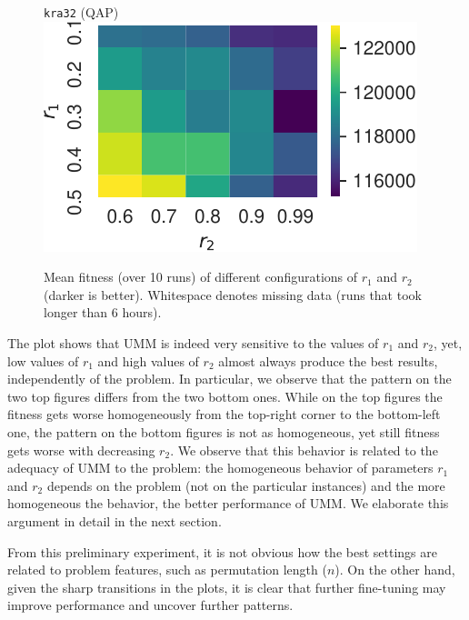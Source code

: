 \documentclass[runningheads]{llncs}
\begin{document}
\begin{figure}[htb]
\begin{minipage}{0.49\linewidth}
\end{minipage}
\begin{minipage}{0.49\linewidth}
  \centering
  \texttt{kra32} (QAP)\\[-0.5ex]
\includegraphics[width=\textwidth]{../img/heatmap_kra32_dat}
\end{minipage}
\caption{Mean fitness (over 10 runs) of different configurations of $r_1$ and $r_2$ (darker is better). Whitespace denotes missing data (runs that took longer than 6 hours).\label{fig:heatmaps}}
\end{figure}

The plot shows that UMM is indeed very sensitive to the values of $r_1$ and
$r_2$, yet, low values of $r_1$ and high values of $r_2$ almost always produce
the best results, independently of the problem.  In particular, we observe that
the pattern on the two top figures differs from the two bottom ones. While on
the top figures the fitness gets worse homogeneously from the top-right corner
to the bottom-left one, the pattern on the bottom figures is not as homogeneous, yet
still fitness gets worse with decreasing $r_2$.  We observe that this behavior
is related to the adequacy of UMM to the problem: the homogeneous behavior of
parameters $r_1$ and $r_2$ depends on the problem (not on the particular
instances) and the more homogeneous the behavior, the better performance of
UMM. We elaborate this argument in detail in the next section.

From this preliminary experiment, it is not obvious how the best settings are
related to problem features, such as permutation length ($n$). On the other
hand, given the sharp transitions in the plots, it is clear that further
fine-tuning may improve performance and uncover further patterns.
\end{document}
